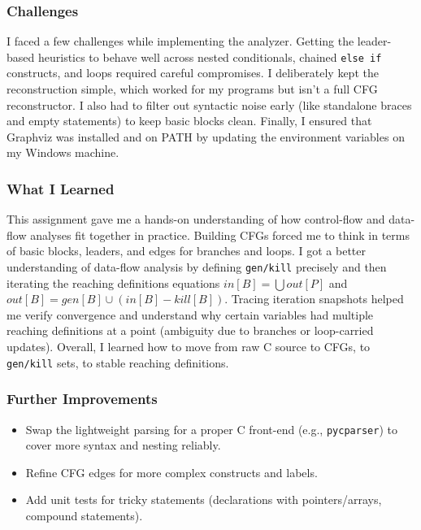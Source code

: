 \subsubsection{Challenges}
I faced a few challenges while implementing the analyzer. Getting the leader-based heuristics to behave well across nested conditionals, chained \texttt{else if} constructs, and loops required careful compromises. I deliberately kept the reconstruction simple, which worked for my programs but isn’t a full CFG reconstructor. I also had to filter out syntactic noise early (like standalone braces and empty statements) to keep basic blocks clean. Finally, I ensured that Graphviz was installed and on PATH by updating the environment variables on my Windows machine.

\subsubsection{What I Learned}
This assignment gave me a hands-on understanding of how control-flow and data-flow analyses fit together in practice. Building CFGs forced me to think in terms of basic blocks, leaders, and edges for branches and loops. I got a better understanding of data-flow analysis by defining \texttt{gen/kill} precisely and then iterating the reaching definitions equations $in[B] = \bigcup out[P]$ and $out[B] = gen[B] \cup (in[B] - kill[B])$. Tracing iteration snapshots helped me verify convergence and understand why certain variables had multiple reaching definitions at a point (ambiguity due to branches or loop-carried updates). Overall, I learned how to move from raw C source to CFGs, to \texttt{gen/kill} sets, to stable reaching definitions.

\subsubsection{Further Improvements}
\begin{itemize}[itemsep=0em, topsep=0pt]
    \item Swap the lightweight parsing for a proper C front-end (e.g., \texttt{pycparser}) to cover more syntax and nesting reliably.
    \item Refine CFG edges for more complex constructs and labels.
    \item Add unit tests for tricky statements (declarations with pointers/arrays, compound statements).
\end{itemize}

